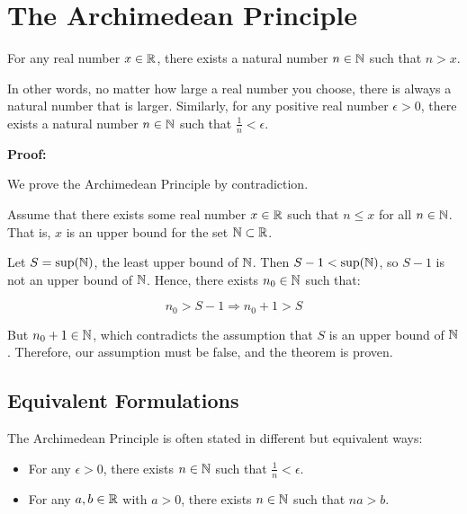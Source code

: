 \newpage
\section{The Archimedean Principle}

For any real number \( x \in \mathbb{R} \), there exists a natural number \( n \in \mathbb{N} \) such 
that \( n > x \).
\vspace{\baselineskip}

In other words, no matter how large a real number you choose, there is always a natural number that 
is larger. Similarly, for any positive real number \( \epsilon > 0 \), there exists a natural number 
\( n \in \mathbb{N} \) such that \( \frac{1}{n} < \epsilon \).
\vspace{\baselineskip}

\textbf{Proof:}

We prove the Archimedean Principle by contradiction.
\vspace{\baselineskip}

Assume that there exists some real number \( x \in \mathbb{R} \) such that \( n \leq x \) for all 
\( n \in \mathbb{N} \). That is, \( x \) is an upper bound for the set \( \mathbb{N} \subset \mathbb{R}\).
\vspace{\baselineskip}

Let \( S = \sup(\mathbb{N}) \), the least upper bound of \( \mathbb{N} \). Then 
\( S - 1 < \sup(\mathbb{N}) \), so \( S - 1 \) is not an upper bound of \( \mathbb{N} \). Hence, 
there exists \( n_0 \in \mathbb{N} \) such that:

\[
	n_0 > S - 1 \Rightarrow n_0 + 1 > S
\]

But \( n_0 + 1 \in \mathbb{N} \), which contradicts the assumption that \( S \) is an upper bound of 
\(\mathbb{N} \). Therefore, our assumption must be false, and the theorem is proven.

\QED

\subsection{Equivalent Formulations}

The Archimedean Principle is often stated in different but equivalent ways:

\begin{itemize}
	
	\item For any \( \epsilon > 0 \), there exists \( n \in \mathbb{N} \) such that \( \frac{1}{n} < 
		  \epsilon \).
	
	\item For any \( a, b \in \mathbb{R} \) with \( a > 0 \), there exists \( n \in \mathbb{N} \) such that 
	      \( na > b \).

\end{itemize}


